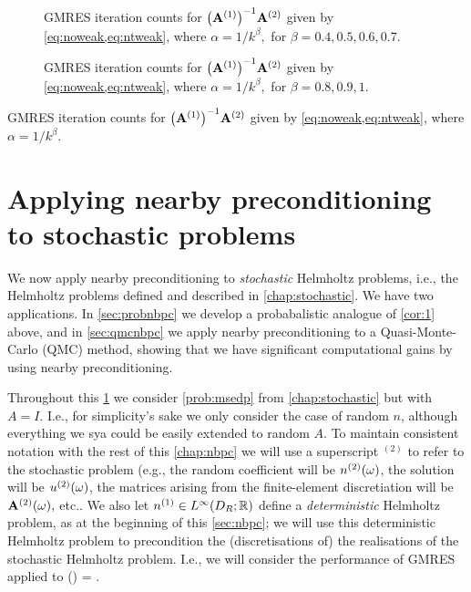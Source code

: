 \begin{figure}
  
    \caption{GMRES iteration counts for $\AmatoI\Amatt$ given by \cref{eq:noweak,eq:ntweak}, where $\alpha = 1/k^\beta,$ for $\beta = 0.4,0.5,0.6,0.7.$}\label{fig:l1med}
\end{figure}
    
    \begin{figure}
    
      \caption{GMRES iteration counts for $\AmatoI\Amatt$ given by \cref{eq:noweak,eq:ntweak}, where $\alpha = 1/k^\beta,$ for $\beta = 0.8,0.9,1.$}\label{fig:l1high}
\end{figure}
      
\begin{table}
  \centering
  
  \caption{GMRES iteration counts for $\AmatoI\Amatt$ given by \cref{eq:noweak,eq:ntweak}, where $\alpha = 1/k^\beta.$}\label{tab:l1}
  \end{table}

\section{Applying nearby preconditioning to stochastic problems}\label{sec:nbpcstochastic}

We now apply nearby preconditioning to \emph{stochastic} Helmholtz problems, i.e., the Helmholtz problems defined and described in \cref{chap:stochastic}. We have two applications. In \cref{sec:probnbpc} we develop a probabalistic analogue of \cref{cor:1} above, and in \cref{sec:qmcnbpc} we apply nearby preconditioning to a Quasi-Monte-Carlo (QMC) method, showing that we have significant computational gains by using nearby preconditioning.

Throughout this \cref{sec:nbpcstochastic} we consider \cref{prob:msedp} from \cref{chap:stochastic} but with $A=I$. I.e., for simplicity's sake we only consider the case of random $n$, although everything we sya could be easily extended to random $A$. To maintain consistent notation with the rest of this \cref{chap:nbpc} we will use a superscript ${}^{(2)}$ to refer to the stochastic problem (e.g., the random coefficient will be ${n}^{(2)}(\omega)$, the solution will be ${u}^{(2)}(\omega)$, the matrices arising from the finite-element discretiation will be $\mathbf{A}^{(2)}(\omega),$ etc.. We also let $\nso \in \LiDRRR$ define a \emph{deterministic} Helmholtz problem, as at the beginning of this \cref{sec:nbpc}; we will use this deterministic Helmholtz problem to precondition the (discretisations of) the realisations of the stochastic Helmholtz problem. I.e., we will consider the performance of GMRES applied to
\beq\label{eq:stopc}
\AmatoI\Amatt(\omega) = \AmatoI \bff.
\eeq

